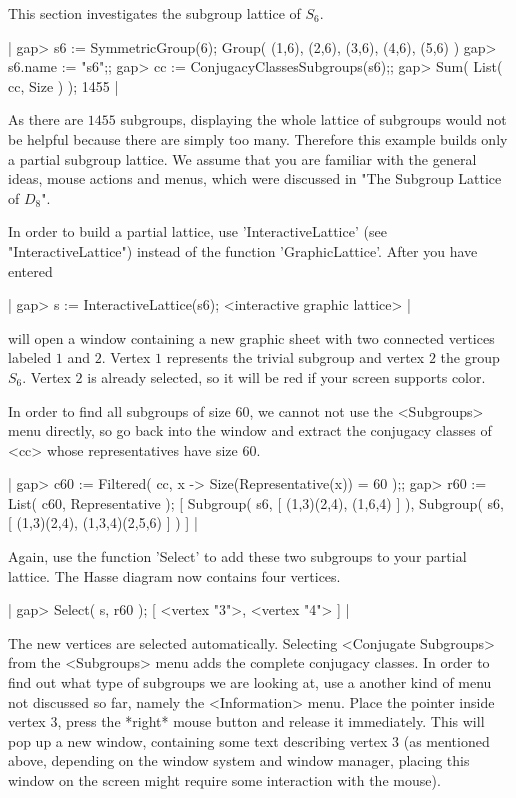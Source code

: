 
This section investigates the subgroup lattice of $S_6$.

|    gap> s6 := SymmetricGroup(6);
    Group( (1,6), (2,6), (3,6), (4,6), (5,6) )
    gap> s6.name := "s6";;
    gap> cc := ConjugacyClassesSubgroups(s6);;
    gap> Sum( List( cc, Size ) );
    1455 |

As  there are $1455$ subgroups, displaying the whole lattice of subgroups
would not be helpful  because there are simply  too many.  Therefore this
example builds  only a partial subgroup  lattice.  We assume that you are
familiar with  the general  ideas,  mouse actions and menus,   which were
discussed in "The Subgroup Lattice of $D_8$".

In  order  to build  a  partial  lattice, use   'InteractiveLattice' (see
"InteractiveLattice") instead of  the  function 'GraphicLattice'.   After
you have entered

|    gap> s := InteractiveLattice(s6);
    <interactive graphic lattice> |

{\XGAP}  will open  a window  containing  a new  graphic  sheet with  two
connected vertices   labeled  $1$ and $2$.     Vertex  $1$ represents the
trivial subgroup and  vertex $2$ the group $S_6$.   Vertex $2$ is already
selected, so it will be red if your screen supports color.

In order  to  find all subgroups   of size $60$, we  cannot   not use the
<Subgroups> menu directly, so go back into the  {\GAP} window and extract
the conjugacy classes of <cc> whose representatives have size $60$.

|    gap> c60 := Filtered( cc, x -> Size(Representative(x)) = 60 );;
    gap> r60 := List( c60, Representative );
    [ Subgroup( s6, [ (1,3)(2,4), (1,6,4) ] ), 
      Subgroup( s6, [ (1,3)(2,4), (1,3,4)(2,5,6) ] ) ] |

Again,  use the  function 'Select'  to  add  these two subgroups  to your
partial lattice.  The Hasse diagram now contains four vertices.

|    gap> Select( s, r60 );
    [ <vertex "3">, <vertex "4"> ] |

The  new  vertices  are   selected automatically.    Selecting <Conjugate
Subgroups> from the <Subgroups> menu adds the complete conjugacy classes.
In order  to find out what  type of subgroups  we are  looking at,  use a
another kind of menu not discussed so far, namely the <Information> menu.
Place the pointer inside vertex  $3$, press the  *right* mouse button and
release it immediately.  This  will pop up a  new window, containing some
text describing  vertex $3$ (as  mentioned above, depending on the window
system   and window manager,  placing   this window on  the  screen might
require some interaction with the mouse).

